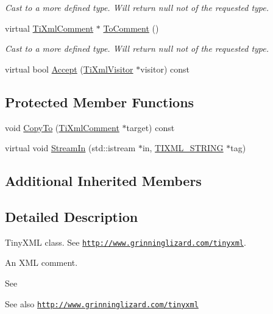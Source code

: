 \begin{DoxyCompactItemize}
\begin{DoxyCompactList}\small\item\em Cast to a more defined type. Will return null not of the requested type. \end{DoxyCompactList}\item 
virtual \hyperlink{class_ti_xml_comment}{Ti\+Xml\+Comment} $\ast$ \hyperlink{class_ti_xml_comment_acc7c7e07e13c23f17797d642981511df}{To\+Comment} ()
\begin{DoxyCompactList}\small\item\em Cast to a more defined type. Will return null not of the requested type. \end{DoxyCompactList}\item 
virtual bool \hyperlink{class_ti_xml_comment_ac894241530d1d266131a5026cb251a95}{Accept} (\hyperlink{class_ti_xml_visitor}{Ti\+Xml\+Visitor} $\ast$visitor) const
\end{DoxyCompactItemize}
\subsection*{Protected Member Functions}
\begin{DoxyCompactItemize}
\item 
void \hyperlink{class_ti_xml_comment_aaeb8a0b2d503f603879a2d04ceb54295}{Copy\+To} (\hyperlink{class_ti_xml_comment}{Ti\+Xml\+Comment} $\ast$target) const
\item 
virtual void \hyperlink{class_ti_xml_comment_ad69c1024082f716462b6fd4b94488320}{Stream\+In} (std\+::istream $\ast$in, \hyperlink{tinyxml_8h_a92bada05fd84d9a0c9a5bbe53de26887}{T\+I\+X\+M\+L\+\_\+\+S\+T\+R\+I\+NG} $\ast$tag)
\end{DoxyCompactItemize}
\subsection*{Additional Inherited Members}


\subsection{Detailed Description}
Tiny\+X\+ML class. See \href{http://www.grinninglizard.com/tinyxml}{\tt http\+://www.\+grinninglizard.\+com/tinyxml}. 

An X\+ML comment.

See \begin{DoxySeeAlso}{See also}
\href{http://www.grinninglizard.com/tinyxml}{\tt http\+://www.\+grinninglizard.\+com/tinyxml} 
\end{DoxySeeAlso}


